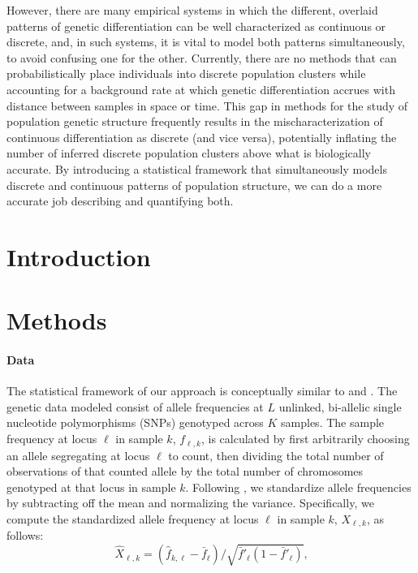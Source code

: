 \documentclass[12pt]{article}
\begin{document}
However, there are many empirical systems in which the different, overlaid patterns of genetic 
differentiation can be well characterized as continuous or discrete, and, in such systems, it is 
vital to model both patterns simultaneously, to avoid confusing one for the other.  Currently, 
there are no methods that can probabilistically place individuals into discrete population clusters 
while accounting for a background rate at which genetic differentiation accrues with distance 
between samples in space or time.  This gap in methods for the study of population genetic 
structure frequently results in the mischaracterization of continuous differentiation as discrete 
(and vice versa), potentially inflating the number of inferred discrete population clusters 
above what is biologically accurate.  By introducing a statistical framework that simultaneously 
models discrete and continuous patterns of population structure, we can do a more accurate 
job describing and quantifying both.


%


\newpage
\section*{Introduction}

\section*{Methods}
\paragraph{Data}
The statistical framework of our approach is conceptually similar to \cite{Wasser2004} and \cite{spacemix}.
The genetic data modeled consist of allele frequencies at $L$ unlinked, bi-allelic single nucleotide polymorphisms (SNPs) genotyped across $K$ samples.
The sample frequency at locus $\ell$ in sample $k$, $f_{\ell,k}$, is calculated by first arbitrarily choosing an allele segregating 
at locus $\ell$ to count, 
then dividing the total number of observations of that counted allele by the total number of chromosomes genotyped at that locus
in sample $k$.
Following \cite{spacemix}, 
we standardize allele frequencies by subtracting off the mean and normalizing the variance. 
Specifically, we compute the standardized allele frequency at locus $\ell$ in sample $k$, $X_{\ell,k}$, as follows:
\begin{equation}
\hat{X}_{\ell,k} = (\hat{f}_{k,\ell}  - \bar{f}_{\ell})/\sqrt{\bar{f}'_{\ell}(1-\bar{f}'_{\ell})}\text{,}
\end{equation}
\end{document}
